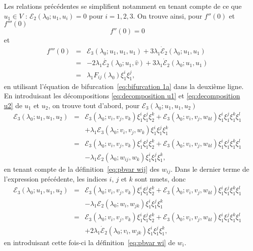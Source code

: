 \documentclass{article}
\begin{document}
Les relations précédentes se simplifient notamment en tenant compte de
ce que $u_1∈V$ : $ℰ_2 (λ_0 ; u_1, u_i) = 0$ pour $i = 1,
2, 3$. On trouve ainsi, pour $f'' (0)$ et $f''' (0)$
\begin{equation}
  \label{eq:DL energie derivee 2nde} f'' (0) = 0
\end{equation}
et
\begin{eqnarray}
  f''' (0) & = & ℰ_3 (λ_0 ; u_1, u_1, u_1) + 3 λ_1
  \dot{ℰ}_2 (λ_0 ; u_1, u_1) \nonumber\\
  & = & - 2 λ_1  \dot{ℰ_2} (λ_0 ; u_1, \hat{v}) + 3
  λ_1  \dot{ℰ}_2 (λ_0 ; u_1, u_1) \nonumber\\
  & = & λ_1 F_{i  j} (λ_0) \xi_1^i \xi_1^j,  \label{eq:DL
  energie derivee 3ieme}
\end{eqnarray}
en utilisant l'équation de bifurcation~\eqref{eq:bifurcation 1a} dans la
deuxième ligne. En introduisant les décompositions
\eqref{eq:decomposition u1} et \eqref{eq:decomposition u2} de $u_1$ et $u_2$,
on trouve tout d'abord, pour $ℰ_3 (λ_0 ; u_1, u_1, u_2)$
\begin{eqnarray*}
  ℰ_3 (λ_0 ; u_1, u_1, u_2) & = & ℰ_3 (λ_0 ;
  v_i, v_j, v_k) \xi_1^i \xi_1^j \xi_2^k +ℰ_3 (λ_0 ; v_i, v_j,
  w_{k  l}) \xi_1^i \xi_1^j \xi_1^k \xi_1^l\\
  &  &  + λ_1 ℰ_3 (λ_0 ; v_i, v_j, w_k)
  \xi_1^i \xi_1^j \xi_1^k\\
  & = & ℰ_3 (λ_0 ; v_i, v_j, v_k) \xi_1^i \xi_1^j \xi_2^k
  +ℰ_3 (λ_0 ; v_i, v_j, w_{k  l}) \xi_1^i \xi_1^j
  \xi_1^k \xi_1^l\\
  &  &  - λ_1 ℰ_2 (λ_0 ; w_{i  j},
  w_k) \xi_1^i \xi_1^j \xi_1^k,
\end{eqnarray*}
en tenant compte de la définition~\eqref{eq:pbvar wij} des $w_{i
j}$. Dans le dernier terme de l'expression précédente, les indices
$i$, $j$ et $k$ sont muets, donc
\begin{eqnarray*}
  ℰ_3 (λ_0 ; u_1, u_1, u_2) & = & ℰ_3 (λ_0 ;
  v_i, v_j, v_k) \xi_1^i \xi_1^j \xi_2^k +ℰ_3 (λ_0 ; v_i, v_j,
  w_{k  l}) \xi_1^i \xi_1^j \xi_1^k \xi_1^l\\
  &  &  - λ_1 ℰ_2 (λ_0 ; w_{i }, w_{j
   k}) \xi_1^i \xi_1^j \xi_1^k\\
  & = & ℰ_3 (λ_0 ; v_i, v_j, v_k) \xi_1^i \xi_1^j \xi_2^k
  +ℰ_3 (λ_0 ; v_i, v_j, w_{k  l}) \xi_1^i \xi_1^j
  \xi_1^k \xi_1^l\\
  &  &  + 2 λ_1  \dot{ℰ}_2 (λ_0 ; v_{i
  }, w_{j  k}) \xi_1^i \xi_1^j \xi_1^k,
\end{eqnarray*}
en introduisant cette fois-ci la définition~\eqref{eq:pbvar wi} de $w_i .$
\end{document}
